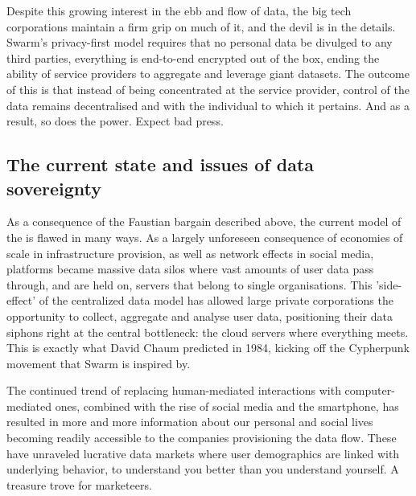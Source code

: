 Despite this growing interest in the ebb and flow of data, the big tech corporations maintain a firm grip on much of it, and the devil is in the details. Swarm's privacy-first model requires that no personal data be divulged to any third parties, everything is end-to-end encrypted out of the box, ending the ability of service providers to aggregate and leverage giant datasets. The outcome of this is that instead of being concentrated at the service provider, control of the data remains decentralised and with the individual to which it pertains. And as a result, so does the power. Expect bad press.

\subsection{The current state and issues of data sovereignty \statusgreen }\label{sec:data-sovereignty}

As a consequence of the Faustian bargain described above, the current model of the  is flawed in many ways. As a largely unforeseen consequence of economies of scale in infrastructure provision, as well as network effects in social media, platforms became massive data silos where vast amounts of user data pass through, and are held on, servers that belong to single organisations. This 'side-effect' of the centralized data model has allowed large private corporations the opportunity to collect, aggregate and analyse user data, positioning their data siphons right at the central bottleneck: the cloud servers where everything meets. This is exactly what David Chaum predicted in 1984, kicking off the Cypherpunk movement that Swarm is inspired by.

The continued trend of replacing human-mediated interactions with computer-mediated ones, combined with the rise of social media and the smartphone, has resulted in more and more information about our personal and social lives becoming readily accessible to the companies provisioning the data flow. These have unraveled lucrative data markets where user demographics are linked with underlying behavior, to understand you better than you understand yourself. A treasure trove for marketeers.

